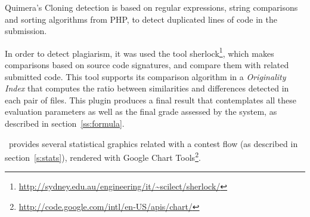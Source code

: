 Quimera's Cloning detection is based on regular expressions, string comparisons and sorting algorithms from PHP, to detect duplicated lines of code in the submission.

In order to detect plagiarism, it was used the tool \textsf{sherlock}\footnote{\url{http://sydney.edu.au/engineering/it/~scilect/sherlock/}}, which makes comparisons based on source code signatures, and compare them with related submitted code.
This tool supports its comparison algorithm in a \emph{Originality Index} that computes the ratio between similarities and differences detected in each pair of files.
This plugin produces a final result that contemplates all these evaluation parameters as well as the final grade assessed by the system, as described in section~\ref{ss:formula}.

\quim\ provides several statistical graphics related with a contest flow (as described in section~\ref{s:stats}), rendered with \textsf{Google Chart Tools\footnote{\url{http://code.google.com/intl/en-US/apis/chart/}}}.





